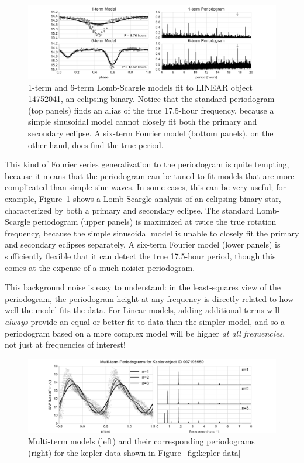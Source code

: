 \documentclass[preprint]{aastex}
\newcommand{\fig}[1]{Figure~\ref{fig:#1}}
\newcommand{\figlabel}[1]{\label{fig:#1}}
\begin{document}
\begin{figure}[ht]
  \centering
  \includegraphics[width=\textwidth]{fig23_binary_multiterm}
  \caption{1-term and 6-term Lomb-Scargle models fit to LINEAR object
    14752041, an eclipsing binary. Notice that the standard periodogram
    (top panels) finds an alias of the true 17.5-hour frequency,
    because a simple sinusoidal model cannot closely fit both the primary
    and secondary eclipse. A six-term Fourier model (bottom panels), on
    the other hand, does find the true period.
    \figlabel{binary-multiterm}}
\end{figure}

This kind of Fourier series generalization to the periodogram is quite
tempting, because it means that the periodogram can be tuned to fit models
that are more complicated than simple sine waves.
In some cases, this can be very useful; for example, \fig{binary-multiterm}
shows a Lomb-Scargle analysis of an eclipsing binary star, characterized by
both a primary and secondary eclipse.
The standard Lomb-Scargle periodogram (upper panels) is maximized at twice the true rotation
frequency, because the simple sinusoidal model is unable to closely fit the
primary and secondary eclipses separately.
A six-term Fourier model (lower panels) is sufficiently flexible that it can
detect the true 17.5-hour period, though this comes at the expense of a much
noisier periodogram.

This background noise is easy to understand: in the least-squares view of the
periodogram, the periodogram height at any frequency is directly related to
how well the model fits the data.
For Linear models, adding additional terms will {\it always} provide an
equal or better fit to data than the simpler model, and so a periodogram based
on a more complex model will be higher {\it at all frequencies}, not just
at frequencies of interest!

\begin{figure}[ht]
  \centering
  \includegraphics[width=\textwidth]{fig21_kepler_multiterm}
  \caption{Multi-term models (left) and their corresponding periodograms (right)
    for the kepler data shown in \fig{kepler-data}
    \figlabel{kepler-multiterm}}
\end{figure}
\end{document}
